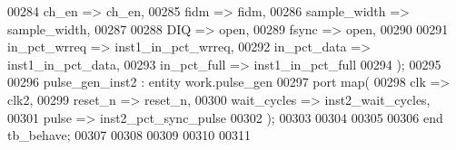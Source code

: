 \begin{DoxyCode}
00284       ch_en                => ch_en,
00285       fidm                 => fidm,
00286       sample_width         => sample_width,
00287 
00288       DIQ                  => \textcolor{keywordflow}{open},
00289       fsync                => \textcolor{keywordflow}{open},
00290 
00291       in_pct_wrreq         => inst1_in_pct_wrreq,
00292       in_pct_data          => inst1_in_pct_data,
00293       in_pct_full          => inst1_in_pct_full
00294         \textcolor{vhdlchar}{)};
00295         
00296 pulse\_gen\_inst2 : \textcolor{keywordflow}{entity} work.pulse_gen
00297    \textcolor{keywordflow}{port} \textcolor{keywordflow}{map}(
00298       clk         => clk2,
00299       reset_n     => reset_n,
00300       wait_cycles => inst2_wait_cycles,
00301       pulse       => inst2_pct_sync_pulse
00302    \textcolor{vhdlchar}{)};
00303 
00304 
00305 
00306     \textcolor{keywordflow}{end} \textcolor{vhdlchar}{tb\_behave};
00307   
00308   
00309 
00310 
00311   
\end{DoxyCode}

